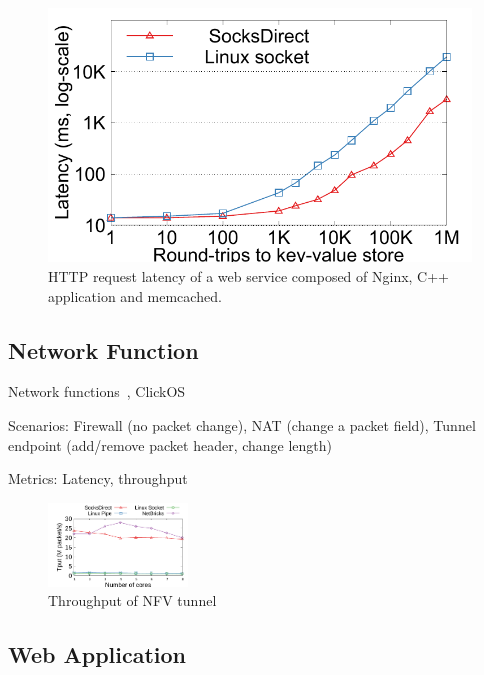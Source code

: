 \begin{figure}[t!]
\begin{minipage}{.32\textwidth}
		\centering \includegraphics[width=\textwidth]{eval/microbenchmark/nginx-multiround-tput.pdf}
		\vspace{-15pt}
		\caption{HTTP request latency of a web service composed of Nginx, C++ application and memcached.}
		\label{fig:eval-nginx-multiround}
	\end{minipage}
\end{figure}

\subsection{Network Function}

Network functions~\cite{li2016clicknp}, ClickOS~\cite{martins2014clickos}

Scenarios: Firewall (no packet change), NAT (change a packet field), Tunnel endpoint (add/remove packet header, change length)

Metrics: Latency, throughput

\begin{figure}[htpb]
	\centering
	\includegraphics[width=0.33\textwidth]{eval/microbenchmark/nfv-tun-tput.pdf}
	\caption{Throughput of NFV tunnel}
	\label{fig:eval-tun-tput}
\end{figure}



\subsection{Web Application}

